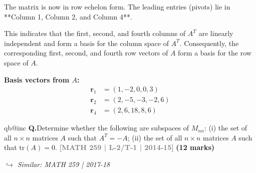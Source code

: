 \documentclass[12pt,a3paper]{article}
\makeatletter
\newcommand{\yr}[1]{\hfill\textcolor{gray}{\small\textbf{[#1]}}}
\newcommand{\mk}[1]{\textcolor{orange!70!black}{\small\textbf{(#1 marks)}}}
\newcommand{\variant}[1]{\par\vspace{1pt}\textcolor{blue!50!black}%
  {\footnotesize\textit{$\hookrightarrow$ Similar: #1}}}
\newcounter{qnum}
\newcommand{\Q}[1]{%
  \csname qb@inc\endcsname
  \needspace{4\baselineskip}
  \refstepcounter{qnum}
  \vspace{6pt}
  \noindent\textbf{Q\theqnum.}\enspace #1\par
}
\makeatother
\begin{document}
\begin{tcolorbox}[enhanced,breakable,
  colback=cC!4,colframe=cC,boxrule=0.8pt,arc=5pt,
  title={\textbf{Answer --- Basis for the Row Space}},
  fonttitle=\bfseries\color{white},colbacktitle=cC]
The matrix is now in row echelon form. The leading entries (pivots) lie in **Column 1, Column 2, and Column 4**. 

This indicates that the first, second, and fourth columns of $A^T$ are linearly independent and form a basis for the column space of $A^T$. Consequently, the corresponding first, second, and fourth row vectors of $A$ form a basis for the row space of $A$.

\vspace{0.3cm}
\textbf{Basis vectors from $A$:}
\begin{align*}
\mathbf{r}_1 &= (1, -2, 0, 0, 3) \\
\mathbf{r}_2 &= (2, -5, -3, -2, 6) \\
\mathbf{r}_4 &= (2, 6, 18, 8, 6)
\end{align*}

\end{tcolorbox}

\Q{Determine whether the following are subspaces of $M_{nn}$: (i) the set of all $n \times n$ matrices $A$ such that $A^T = -A$; (ii) the set of all $n \times n$ matrices $A$ such that $\mathrm{tr}(A) = 0$.
\yr{MATH 259 | L-2/T-1 | 2014-15} \mk{12}
\variant{MATH 259 | 2017-18}}
\end{document}
